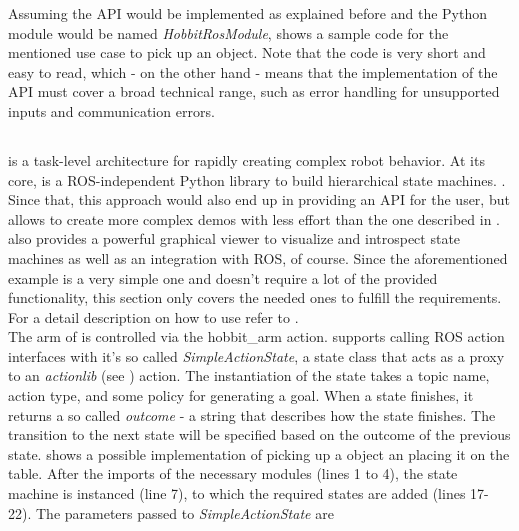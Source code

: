 Assuming the API would be implemented as explained before and the Python module would be named \textit{HobbitRosModule},  shows a sample code for the mentioned use case to pick up an object. Note that the code is very short and easy to read, which - on the other hand - means that the implementation of the API must cover a broad technical range, such as error handling for unsupported inputs and communication errors.

\begin{figure}[htbp]
	
\end{figure}

\subsection{\smach{}}
\smach{} is a task-level architecture for rapidly creating complex robot behavior. At its core, \smach{} is a ROS-independent Python library to build hierarchical state machines. \cite{SmachROS}. Since that, this approach would also end up in providing an API for the user, but allows to create more complex demos with less effort than the one described in . \smach{} also provides a powerful graphical viewer to visualize and introspect state machines as well as an integration with ROS, of course. Since the aforementioned example is a very simple one and doesn't require a lot of the provided \smach{} functionality, this section only covers the needed ones to fulfill the requirements. For a detail description on how to use \smach{} refer to \cite{SmachROS}. \\

The arm of \hobbit{} is controlled via the hobbit\_arm action. \smach{} supports calling ROS action interfaces with it's so called \textit{SimpleActionState}, a state class that acts as a proxy to an \textit{actionlib} (see ) action. The instantiation of the state takes a topic name, action type, and some policy for generating a goal. When a state finishes, it returns a so called \textit{outcome} - a string that describes how the state finishes. The transition to the next state will be specified based on the outcome of the previous state.  shows a possible implementation of picking up a object an placing it on the table. After the imports of the necessary modules (lines 1 to 4), the state machine is instanced (line 7), to which the required states are added (lines 17-22). The parameters passed to \textit{SimpleActionState} are

